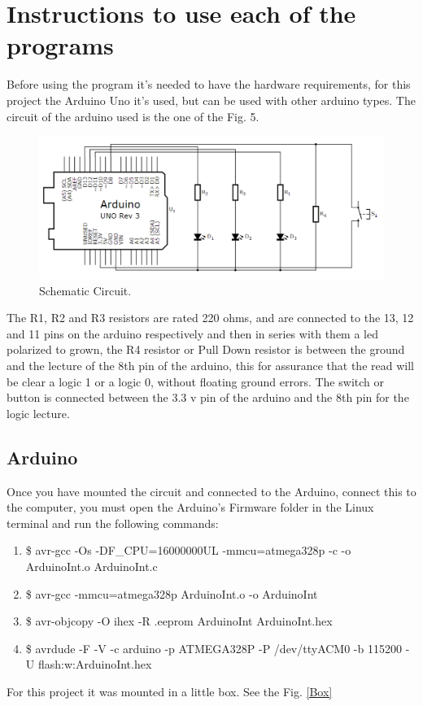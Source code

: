 \documentclass[12pt]{article}
\begin{document}
\section{Instructions to use each of the programs}
Before using the program it's needed to have the hardware requirements, for this project the Arduino Uno it's used, but can be used with other arduino types. The circuit of the arduino used is the one of the Fig. 5.
\begin{figure}[h!]
 	\centering
  	\includegraphics[scale=0.5]
  	{Fig/ArduinoCircuit.png}    
  	\caption{Schematic Circuit.}
\end{figure}

The R1, R2 and R3 resistors are rated 220 ohms, and are connected to the 13, 12 and 11 pins on the arduino respectively and then in series with them a led polarized to grown, the R4 resistor or Pull Down resistor is between the ground and the lecture of the 8th pin of the arduino, this for assurance that the read will be clear a logic 1 or a logic 0, without floating ground errors. The switch or button is connected between the 3.3 v pin of the arduino and the 8th pin for the logic lecture.
\subsection{Arduino}
Once you have mounted the circuit and connected to the Arduino, connect this to the computer, you must open the Arduino's Firmware folder in the Linux terminal and run the following commands:
\begin{enumerate}
\item \$ avr-gcc -Os -DF\_CPU=16000000UL -mmcu=atmega328p -c -o ArduinoInt.o ArduinoInt.c
\item \$ avr-gcc -mmcu=atmega328p ArduinoInt.o -o ArduinoInt
\item \$ avr-objcopy -O ihex -R .eeprom ArduinoInt ArduinoInt.hex
\item \$ avrdude -F -V -c arduino -p ATMEGA328P -P /dev/ttyACM0 -b 115200 -U flash:w:ArduinoInt.hex
\end{enumerate}
For this project it was mounted in a little box. See the Fig. \ref{Box}
\end{document}
